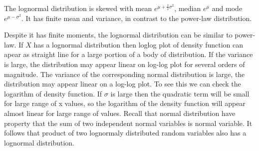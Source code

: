 The lognormal distribution is skewed with mean $e^{\mu + \frac{1}{2}\sigma^2}$, median $e^\mu$ and mode $e^{\mu - \sigma^2 }$. It has finite mean and variance, in contrast to the power-law distribution.  

Despite it has finite moments, the lognormal distribution can be similar to power-law. If $X$ has a lognormal distribution then loglog plot of density function can apear as straight line for a large portion of a body of distribution. If the variance is large, the distribution may appear linear on log-log plot for several orders of magnitude. The variance of the corresponding normal distribution is large, the distribution may appear linear on a log-log plot. To see this we can check the logarithm of density function. 
If $\sigma$ is large then the quadratic term will be small for large range of x values, so the logarithm of the density function will appear almost linear for large range of values. 
Recall that normal distribution have property that the sum of two independent normal variables is normal variable. It follows that product of two lognormaly distributed random variables also has a lognormal distribution. 




